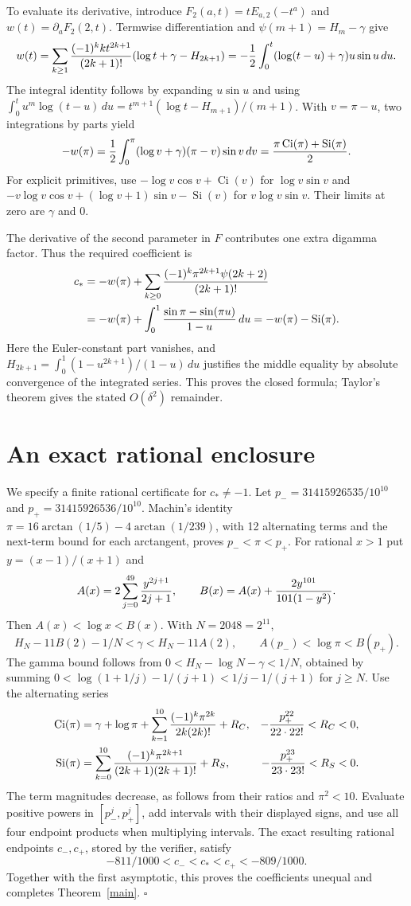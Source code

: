 \documentclass[11pt]{article}
\newcommand{\Si}{\operatorname{Si}}
\newcommand{\Ci}{\operatorname{Ci}}
\begin{document}
To evaluate its derivative, introduce
$F_2(a,t)=tE_{a,2}(-t^a)$ and $w(t)=\partial_a F_2(2,t)$.
Termwise differentiation and $\psi(m+1)=H_m-\gamma$ give
\[
 w(t)=\sum_{k\geq1}{(-1)^k k t^{2k+1}\over(2k+1)!}
             (\log t+\gamma-H_{2k+1})
 =-{1\over2}\int_0^t(\log(t-u)+\gamma)u\sin u\,du.
\]
The integral identity follows by expanding $u\sin u$ and using
$\int_0^t u^m\log(t-u)\,du=
t^{m+1}(\log t-H_{m+1})/(m+1)$.
With $v=\pi-u$, two integrations by parts yield
\[
 -w(\pi)={1\over2}\int_0^\pi(\log v+\gamma)(\pi-v)\sin v\,dv
         ={\pi\Ci(\pi)+\Si(\pi)\over2}.
\]
For explicit primitives, use
$-\log v\cos v+\Ci(v)$ for $\log v\sin v$ and
$-v\log v\cos v+(\log v+1)\sin v-\Si(v)$ for
$v\log v\sin v$. Their limits at zero are $\gamma$ and $0$.

The derivative of the second parameter in $F$ contributes one extra
digamma factor. Thus the required coefficient is
\begin{align*}
 c_*&=-w(\pi)+\sum_{k\geq0}
       {(-1)^k\pi^{2k+1}\psi(2k+2)\over(2k+1)!}\\
 &=-w(\pi)+\int_0^1{\sin\pi-\sin(\pi u)\over1-u}\,du
 =-w(\pi)-\Si(\pi).
\end{align*}
Here the Euler-constant part vanishes, and
$H_{2k+1}=\int_0^1(1-u^{2k+1})/(1-u)\,du$ justifies the
middle equality by absolute convergence of the integrated series.
This proves the closed formula; Taylor's theorem gives the stated
$O(\delta^2)$ remainder.

\section*{An exact rational enclosure}
We specify a finite rational certificate for $c_*\ne-1$.
Let $p_-=31415926535/10^{10}$ and $p_+=31415926536/10^{10}$.
Machin's identity $\pi=16\arctan(1/5)-4\arctan(1/239)$,
with 12 alternating terms and the next-term bound for each arctangent,
proves $p_-<\pi<p_+$.
For rational $x>1$ put $y=(x-1)/(x+1)$ and
\[
 A(x)=2\sum_{j=0}^{49}{y^{2j+1}\over2j+1},\qquad
 B(x)=A(x)+{2y^{101}\over101(1-y^2)}.
\]
Then $A(x)<\log x<B(x)$. With $N=2048=2^{11}$,
\[
 H_N-11B(2)-1/N<\gamma<H_N-11A(2),\qquad
 A(p_-)<\log\pi<B(p_+).
\]
The gamma bound follows from
$0<H_N-\log N-\gamma<1/N$, obtained by summing
$0<\log(1+1/j)-1/(j+1)<1/j-1/(j+1)$ for $j\geq N$.
Use the alternating series
\begin{align*}
 \Ci(\pi)&=\gamma+\log\pi+
       \sum_{k=1}^{10}{(-1)^k\pi^{2k}\over2k(2k)!}+R_C,
 &-{p_+^{22}\over22\cdot22!}<R_C<0,\\
 \Si(\pi)&=\sum_{k=0}^{10}
       {(-1)^k\pi^{2k+1}\over(2k+1)(2k+1)!}+R_S,
 &-{p_+^{23}\over23\cdot23!}<R_S<0.
\end{align*}
The term magnitudes decrease, as follows from their ratios and
$\pi^2<10$. Evaluate positive powers in $[p_-^j,p_+^j]$, add
intervals with their displayed signs, and use all four endpoint
products when multiplying intervals. The exact resulting rational
endpoints $c_-,c_+$, stored by the verifier, satisfy
\[
 -811/1000<c_-<c_*<c_+<-809/1000.
\]
Together with the first asymptotic, this proves the coefficients
unequal and completes Theorem~\ref{main}.
\hfill$\square$
\end{document}

